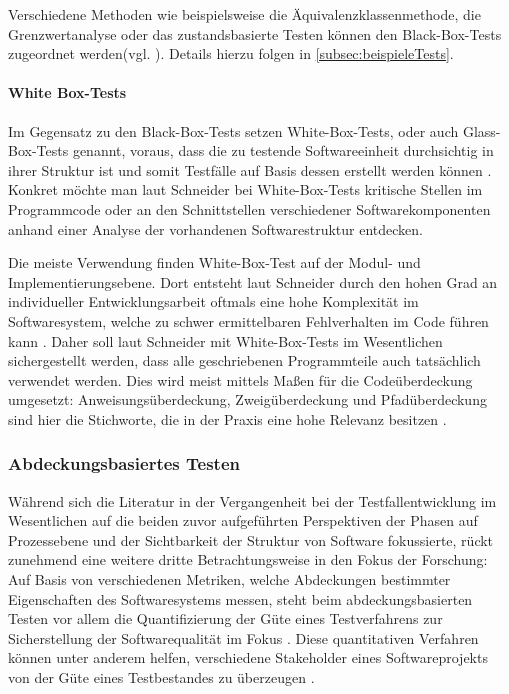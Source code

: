 Verschiedene Methoden wie beispielsweise die Äquivalenzklassenmethode, die Grenzwertanalyse oder das zustandsbasierte Testen können den Black-Box-Tests zugeordnet werden(vgl. \cite[S. 94 ff.]{schneider2012abenteuer}). Details hierzu folgen in \autoref{subsec:beispieleTests}.

\paragraph{White Box-Tests}

Im Gegensatz zu den Black-Box-Tests setzen White-Box-Tests, oder auch Glass-Box-Tests genannt, voraus, dass die zu testende Softwareeinheit durchsichtig in ihrer Struktur ist und somit Testfälle auf Basis dessen erstellt werden können \cite[S. 91]{schneider2012abenteuer}. Konkret möchte man laut Schneider \cite[S. 91]{schneider2012abenteuer} bei White-Box-Tests kritische Stellen im Programmcode oder an den Schnittstellen verschiedener Softwarekomponenten anhand einer Analyse der vorhandenen Softwarestruktur entdecken.

Die meiste Verwendung finden White-Box-Test auf der Modul- und Implementierungsebene. Dort entsteht laut Schneider durch den hohen Grad an individueller Entwicklungsarbeit oftmals eine hohe Komplexität im Softwaresystem, welche zu schwer ermittelbaren Fehlverhalten im Code führen kann \cite[S. 108]{schneider2012abenteuer}. Daher soll laut Schneider \cite[S. 108 ff.]{schneider2012abenteuer} mit White-Box-Tests im Wesentlichen sichergestellt werden, dass alle geschriebenen Programmteile auch tatsächlich verwendet werden. Dies wird meist mittels Maßen für die Codeüberdeckung umgesetzt: Anweisungsüberdeckung, Zweigüberdeckung und Pfadüberdeckung sind hier die Stichworte, die in der Praxis eine hohe Relevanz besitzen \cite[S. 109 ff.]{schneider2012abenteuer}. 

\subsubsection{Abdeckungsbasiertes Testen}\label{subsec:abdeckung}

Während sich die Literatur in der Vergangenheit bei der Testfallentwicklung im Wesentlichen auf die beiden zuvor aufgeführten Perspektiven der Phasen auf Prozessebene und der Sichtbarkeit der Struktur von Software fokussierte, rückt zunehmend eine weitere dritte Betrachtungsweise in den Fokus der Forschung: Auf Basis von verschiedenen Metriken, welche Abdeckungen bestimmter Eigenschaften des Softwaresystems messen, steht beim abdeckungsbasierten Testen vor allem die Quantifizierung der Güte eines Testverfahrens zur Sicherstellung der Softwarequalität im Fokus \cite{craig2002systematic}. Diese quantitativen Verfahren können unter anderem helfen, verschiedene Stakeholder eines Softwareprojekts von der Güte eines Testbestandes zu überzeugen \cite{kuhn2010practical}.

